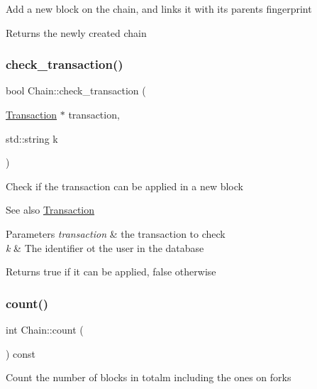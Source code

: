 Add a new block on the chain, and links it with its parent\textquotesingle{}s fingerprint

\begin{DoxyReturn}{Returns}
the newly created chain 
\end{DoxyReturn}
\mbox{\label{classChain_a5725ffa89b1f0333536238951d9acd91}} 
\subsubsection{\texorpdfstring{check\+\_\+transaction()}{check\_transaction()}}
{\footnotesize\ttfamily bool Chain\+::check\+\_\+transaction (\begin{DoxyParamCaption}\item[{\mbox{\hyperlink{classTransaction}{Transaction}} $\ast$}]{transaction,  }\item[{std\+::string}]{k }\end{DoxyParamCaption})}

Check if the transaction can be applied in a new block \begin{DoxySeeAlso}{See also}
\mbox{\hyperlink{classTransaction}{Transaction}}
\end{DoxySeeAlso}

\begin{DoxyParams}{Parameters}
{\em transaction} & the transaction to check \\
\hline
{\em k} & The identifier ot the user in the database \\
\hline
\end{DoxyParams}
\begin{DoxyReturn}{Returns}
true if it can be applied, false otherwise 
\end{DoxyReturn}
\mbox{\label{classChain_ad06a7e312123831339b614a74ff5c9e0}} 
\subsubsection{\texorpdfstring{count()}{count()}}
{\footnotesize\ttfamily int Chain\+::count (\begin{DoxyParamCaption}{ }\end{DoxyParamCaption}) const}

Count the number of blocks in totalm including the ones on forks

